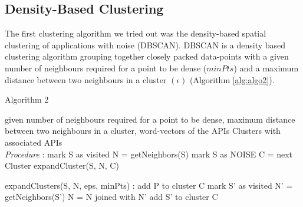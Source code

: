 \documentclass[a4paper]{IEEEtran}
\begin{document}
\subsection{Density-Based Clustering}
The first clustering algorithm we tried out was the density-based spatial clustering of applications with noise (DBSCAN). DBSCAN\cite{kanungo2002efficient} is a density based clustering algorithm grouping together closely packed data-points with a given number of neighbours required for a point to be dense ($minPts$) and a maximum distance between two neighbours in a cluster $(\epsilon)$ (Algorithm \ref{alg:algo2}). 

\begin{algorithm}[H]
 \caption{Algorithm 2}
 \begin{algorithmic}[1]
\renewcommand{\algorithmicrequire}{\textbf{Input:}}
 \renewcommand{\algorithmicensure}{\textbf{Output:}}
 \REQUIRE given number of neighbours required for a point to be dense, \newline maximum distance between two
neighbours in a cluster, \newline word-vectors of the APIs
 \ENSURE  Clusters with associated APIs
 \\ \textit{Procedure} :
\STATE mark S as visited
\STATE N = getNeighbors(S)
\STATE mark S as NOISE
\ELSE
\STATE C = next Cluster
\STATE expandCluster(S, N, C)
\ENDIF
\ENDFOR
\newline
 \end{algorithmic}
 \begin{algorithmic}[2]
 \STATE expandClusters(S, N, eps, minPts) :
\STATE add P to cluster C 
\STATE mark S' as visited
\STATE N' = getNeighbors(S')
\STATE N = N joined with N'
\ENDIF
{}
\STATE add S' to cluster C
\ENDIF
\ENDFOR
 \end{algorithmic}
 \end{algorithm}
\end{document}
